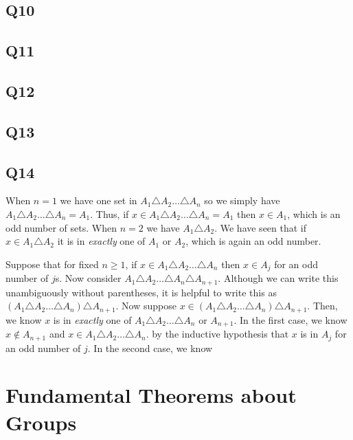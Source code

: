 \documentclass[12pt]{article}
\numberwithin{theorem}{section}
\numberwithin{equation}{section}
\numberwithin{remark}{section}
\numberwithin{definition}{section}
\numberwithin{theorem}{section}
\numberwithin{lemma}{section}
\numberwithin{example}{section}
\begin{document}
\subsection{Q10}

\subsection{Q11}

\subsection{Q12}

\subsection{Q13}

\subsection{Q14}

When $n=1$ we have one set in $A_1\triangle A_2\ldots \triangle A_n$ so we simply have $A_1\triangle A_2\ldots \triangle A_n=A_1$. Thus, if $x\in A_1\triangle A_2\ldots \triangle A_n=A_1$ then $x\in A_1$, which is an odd number of sets. When $n=2$ we have $A_1\triangle A_2$. We have seen that if $x\in A_1\triangle A_2$ it is in \emph{exactly} one of $A_1$ or $A_2$, which is again an odd number.

Suppose that for fixed $n\ge 1$, if $x\in A_1\triangle A_2\ldots \triangle A_n$ then $x\in A_j$ for an odd number of $j$s. Now consider $A_1\triangle A_2\ldots \triangle A_n\triangle A_{n+1}$. Although we can write this unambiguously without parentheses, it is helpful to write this as $(A_1\triangle A_2\ldots \triangle A_n) \triangle A_{n+1}$. Now suppose $x\in(A_1\triangle A_2\ldots \triangle A_n) \triangle A_{n+1}$. Then, we know $x$ is in \emph{exactly} one of $A_1\triangle A_2\ldots \triangle A_n$ or $A_{n+1}$. In the first case, we know $x\notin A_{n+1}$ and $x\in A_1\triangle A_2\ldots \triangle A_n$. by the inductive hypothesis that $x$ is in $A_j$ for an odd number of $j$. In the second case, we know 





\newpage

\section{Fundamental Theorems about Groups}
\end{document}
